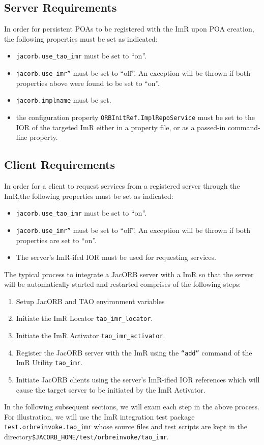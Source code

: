 \subsection{Server Requirements}

In order for persistent POAs to be registered with the ImR upon POA
creation, the following properties must be set as indicated:
\begin{itemize}
    \item {\tt jacorb.use\_tao\_imr} must be set to “on”.
    \item {\tt jacorb.use\_imr”} must be set to “off”.  An exception will be thrown if
              both properties above were found to be set to “on”.
    \item {\tt jacorb.implname} must be set.
    \item the configuration  property {\tt ORBInitRef.ImplRepoService}
              must be set to the IOR of the targeted ImR either in a property file,
              or as a passed-in command-line property.
\end{itemize}

\subsection{Client Requirements}

In order for a client to request services from a registered server through the
ImR,the following properties must be set as indicated:
\begin{itemize}
    \item {\tt jacorb.use\_tao\_imr} must be set to “on”.
    \item {\tt jacorb.use\_imr”} must be set to “off”.  An exception will be thrown if
              both properties are set to “on”.
    \item The server's ImR-ifed IOR must be used for requesting services.
\end{itemize}

The typical process to integrate a JacORB server with a ImR so that the
server will be automatically started and restarted comprises of the following
steps:
\begin{enumerate}
    \item Setup JacORB and TAO environment variables
    \item Initiate the ImR Locator {\tt tao\_imr\_locator}.
    \item Initiate the ImR Activator {\tt tao\_imr\_activator}.
    \item Register the JacORB server with the ImR using the
             {\tt “add”} command of the ImR Utility {\tt tao\_imr}.
    \item Initiate JacORB clients using the server's ImR-ified IOR
              references which will cause the target server to be initiated by
              the ImR Activator.
\end{enumerate}
In the following subsequent sections, we will exam each step in the above
process.  For illustration, we will use the ImR integration test package
{\tt test.orbreinvoke.tao\_imr} whose source files and test scripts are kept
in the directory{\tt \$JACORB\_HOME/test/orbreinvoke/tao\_imr}.

